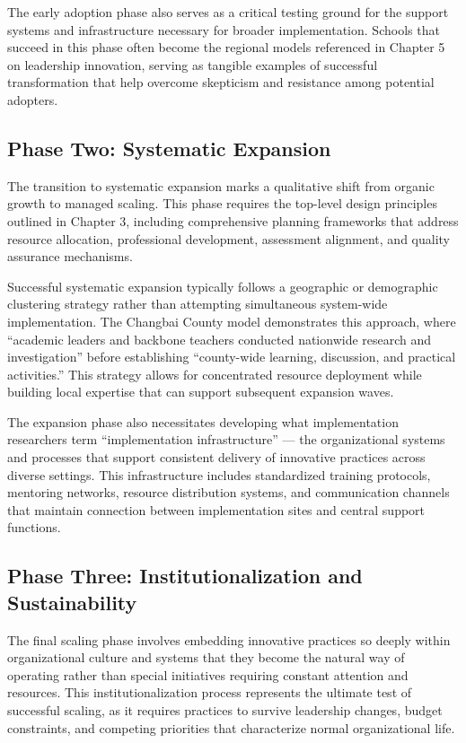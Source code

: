 \documentclass[
  Letterpaper,
]{scrbook}
\begin{document}
The early adoption phase also serves as a critical testing ground for
the support systems and infrastructure necessary for broader
implementation. Schools that succeed in this phase often become the
regional models referenced in Chapter 5 on leadership innovation,
serving as tangible examples of successful transformation that help
overcome skepticism and resistance among potential adopters.

\subsection{Phase Two: Systematic
Expansion}\label{phase-two-systematic-expansion}

The transition to systematic expansion marks a qualitative shift from
organic growth to managed scaling. This phase requires the top-level
design principles outlined in Chapter 3, including comprehensive
planning frameworks that address resource allocation, professional
development, assessment alignment, and quality assurance mechanisms.

Successful systematic expansion typically follows a geographic or
demographic clustering strategy rather than attempting simultaneous
system-wide implementation. The Changbai County model demonstrates this
approach, where ``academic leaders and backbone teachers conducted
nationwide research and investigation'' before establishing
``county-wide learning, discussion, and practical activities.'' This
strategy allows for concentrated resource deployment while building
local expertise that can support subsequent expansion waves.

The expansion phase also necessitates developing what implementation
researchers term ``implementation infrastructure'' --- the
organizational systems and processes that support consistent delivery of
innovative practices across diverse settings. This infrastructure
includes standardized training protocols, mentoring networks, resource
distribution systems, and communication channels that maintain
connection between implementation sites and central support functions.

\subsection{Phase Three: Institutionalization and
Sustainability}\label{phase-three-institutionalization-and-sustainability}

The final scaling phase involves embedding innovative practices so
deeply within organizational culture and systems that they become the
natural way of operating rather than special initiatives requiring
constant attention and resources. This institutionalization process
represents the ultimate test of successful scaling, as it requires
practices to survive leadership changes, budget constraints, and
competing priorities that characterize normal organizational life.
\end{document}
